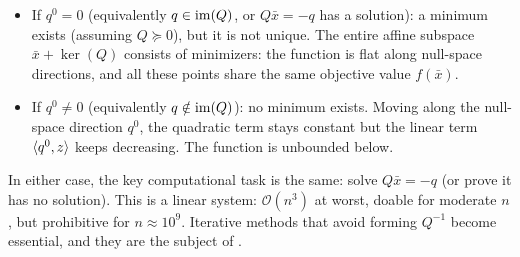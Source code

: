\begin{itemize}
	\item If $q^0 = 0$ (equivalently $q \in \operatorname{im}(Q)$, or $Q\bar{x} = -q$ has a solution): a minimum exists (assuming $Q \succeq 0$), but it is not unique.
		The entire affine subspace $\bar{x} + \ker(Q)$ consists of minimizers: the function is flat along null-space directions, and all these points share the same objective value $f(\bar{x})$.
	\item If $q^0 \neq 0$ (equivalently $q \notin \operatorname{im}(Q)$): no minimum exists.
		Moving along the null-space direction $q^0$, the quadratic term stays constant but the linear term $\langle q^0, z\rangle$ keeps decreasing.
		The function is unbounded below.
\end{itemize}

In either case, the key computational task is the same: solve $Q\bar{x} = -q$ (or prove it has no solution).
This is a linear system: $\mathcal{O}(n^3)$ at worst, doable for moderate $n$, but prohibitive for $n \approx 10^9$.
Iterative methods that avoid forming $Q^{-1}$ become essential, and they are the subject of .